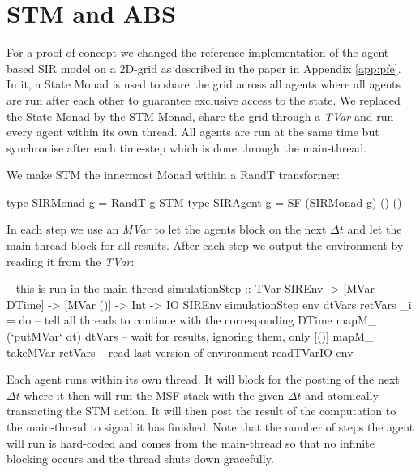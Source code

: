 \section{STM and ABS}

For a proof-of-concept we changed the reference implementation of the agent-based SIR model on a 2D-grid as described in the paper in Appendix \ref{app:pfe}. In it, a State Monad is used to share the grid across all agents where all agents are run after each other to guarantee exclusive access to the state. We replaced the State Monad by the STM Monad, share the grid through a \textit{TVar} and run every agent within its own thread. All agents are run at the same time but synchronise after each time-step which is done through the main-thread.

We make STM the innermost Monad within a RandT transformer:
\begin{HaskellCode}
type SIRMonad g   = RandT g STM
type SIRAgent g   = SF (SIRMonad g) () ()
\end{HaskellCode}

In each step we use an \textit{MVar} to let the agents block on the next $\Delta t$ and let the main-thread block for all results. After each step we output the environment by reading it from the \textit{TVar}:
\begin{HaskellCode}
-- this is run in the main-thread
simulationStep :: TVar SIREnv
               -> [MVar DTime]
               -> [MVar ()]
               -> Int
               -> IO SIREnv
simulationStep env dtVars retVars _i = do
  -- tell all threads to continue with the corresponding DTime
  mapM_ (`putMVar` dt) dtVars
  -- wait for results, ignoring them, only [()]
  mapM_ takeMVar retVars
  -- read last version of environment
  readTVarIO env
\end{HaskellCode}

Each agent runs within its own thread. It will block for the posting of the next $\Delta t$ where it then will run the MSF stack with the given $\Delta t$ and atomically transacting the STM action. It will then post the result of the computation to the main-thread to signal it has finished. Note that the number of steps the agent will run is hard-coded and comes from the main-thread so that no infinite blocking occurs and the thread shuts down gracefully.

